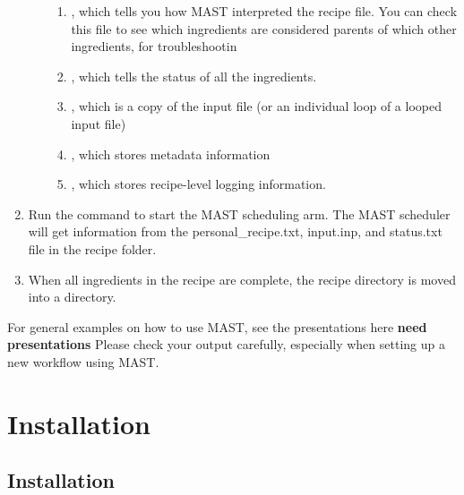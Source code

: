 \documentclass[letterpaper,10pt,english]{sphinxmanual}
\begin{document}
\begin{enumerate}
\begin{enumerate}
\begin{enumerate}
\item {} 
, which tells you how MAST interpreted the recipe file. You can check this file to see which ingredients are considered parents of which other ingredients, for troubleshootin

\item {} 
, which tells the status of all the ingredients.

\item {} 
, which is a copy of the input file (or an individual loop of a looped input file)

\item {} 
, which stores metadata information

\item {} 
, which stores recipe-level logging information.

\end{enumerate}

\end{enumerate}

\item {} 
Run the command  to start the MAST scheduling arm. The MAST scheduler will get information from the personal\_recipe.txt, input.inp, and status.txt file in the recipe folder.

\item {} 
When all ingredients in the recipe are complete, the recipe directory is moved into a  directory.

\end{enumerate}

For general examples on how to use MAST, see the presentations here \textbf{need presentations}
Please check your output carefully, especially when setting up a new workflow using MAST.


\chapter{Installation}
\label{1_0_installation:installation}\label{1_0_installation::doc}

\section{Installation}
\label{1_0_installation:id1}
\end{document}
